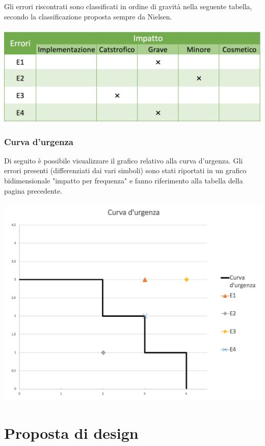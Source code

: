 \documentclass[12pt,a4paper]{report}
\begin{document}
  Gli errori riscontrati sono classificati in ordine di gravità nella seguente tabella, secondo la classificazione proposta sempre da Nielsen.\\\\
  \includegraphics[width=1\textwidth]{"Project Management Sources/ImpattoErrori"}
  \newpage
  \subsection{Curva d'urgenza}
  Di seguito è possibile visualizzare il grafico relativo alla curva d'urgenza. Gli errori presenti (differenziati dai vari simboli) sono stati riportati in un grafico bidimensionale "impatto per frequenza" e fanno riferimento alla tabella della pagina precedente.\\\\
  \includegraphics[width=1\textwidth]{"Project Management Sources/CurvaUrgenza"}
\chapter{Proposta di design}
\end{document}
